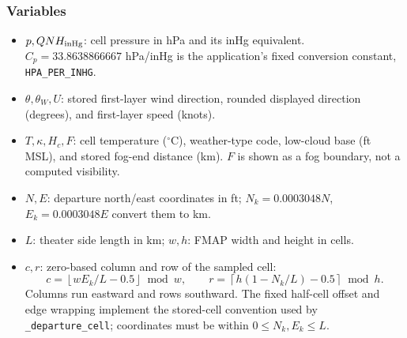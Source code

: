 \documentclass[10pt,a4paper]{amsart}
\begin{document}
\subsubsection*{Variables}
\begin{itemize}
\setlength{\itemsep}{0pt}
\setlength{\parsep}{0pt}
\item $p,QNH_{\rm inHg}$: cell pressure in hPa and its inHg equivalent.
$C_p=33.8638866667$ hPa/inHg is the application's fixed conversion
constant, \texttt{HPA\_PER\_INHG}.
\item $\theta,\theta_W,U$: stored first-layer wind direction,
rounded displayed direction (degrees), and first-layer speed (knots).
\item $T,\kappa,H_c,F$: cell temperature ($^\circ$C), weather-type
code, low-cloud base (ft MSL), and stored fog-end distance (km).
$F$ is shown as a fog boundary, not a computed visibility.
\item $N,E$: departure north/east coordinates in ft;
$N_k=0.0003048N$, $E_k=0.0003048E$ convert them to km.
\item $L$: theater side length in km; $w,h$: FMAP width and height
in cells.
\item $c,r$: zero-based column and row of the sampled cell:
\[
 c=\left\lfloor wE_k/L-0.5\right\rfloor\bmod w,\qquad
 r=\left\lceil h(1-N_k/L)-0.5\right\rceil\bmod h.
\]
Columns run eastward and rows southward. The fixed half-cell
offset and edge wrapping implement the stored-cell convention
used by \texttt{\_departure\_cell}; coordinates must be within
$0\leq N_k,E_k\leq L$.
\end{itemize}
\end{document}
